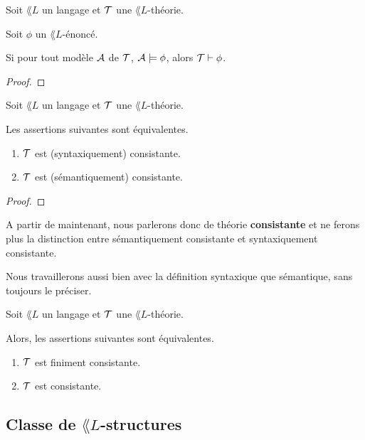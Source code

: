 \documentclass[a4paper, 12pt]{report}
\begin{document}
\begin{theorem} 
	\label{theorem:godel}
	Soit $\lang{L}$ un langage et $\mathcal{T}$ une $\lang{L}$-théorie.

	Soit $\phi$ un $\lang{L}$-énoncé.

	Si pour tout modèle $\mathcal{A}$ de $\mathcal{T}$, $\mathcal{A} \models \phi$,
	alors $\mathcal{T} \vdash \phi$.
\end{theorem}

\ifdefined\outputproof
\begin{proof}

\end{proof}
\fi

\begin{theorem}
	Soit $\lang{L}$ un langage et $\mathcal{T}$ une $\lang{L}$-théorie.

	Les assertions suivantes sont équivalentes.

	\begin{enumerate}
		\item $\mathcal{T}$ est (syntaxiquement) consistante.
		\item $\mathcal{T}$ est (sémantiquement) consistante.
	\end{enumerate}
\end{theorem}

\ifdefined\outputproof
\begin{proof}

\end{proof}
\fi

A partir de maintenant, nous parlerons donc de théorie \textbf{consistante} et
ne ferons plus la distinction entre sémantiquement consistante et syntaxiquement
consistante.

Nous travaillerons aussi bien avec la définition syntaxique que sémantique, sans
toujours le préciser.

\begin{theorem} 
	\label{theorem:compacite}
	Soit $\lang{L}$ un langage et $\mathcal{T}$ une $\lang{L}$-théorie.

	Alors, les assertions suivantes sont équivalentes.

	\begin{enumerate}
		\item $\mathcal{T}$ est finiment consistante.
		\item $\mathcal{T}$ est consistante.
	\end{enumerate}
\end{theorem}
\subsection{Classe de $\lang{L}$-structures}
\end{document}
